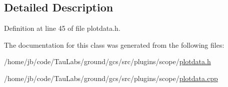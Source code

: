 \subsection{\-Detailed \-Description}


\-Definition at line 45 of file plotdata.\-h.



\-The documentation for this class was generated from the following files\-:\begin{DoxyCompactItemize}
\item 
/home/jb/code/\-Tau\-Labs/ground/gcs/src/plugins/scope/\hyperlink{plotdata_8h}{plotdata.\-h}\item 
/home/jb/code/\-Tau\-Labs/ground/gcs/src/plugins/scope/\hyperlink{plotdata_8cpp}{plotdata.\-cpp}\end{DoxyCompactItemize}
